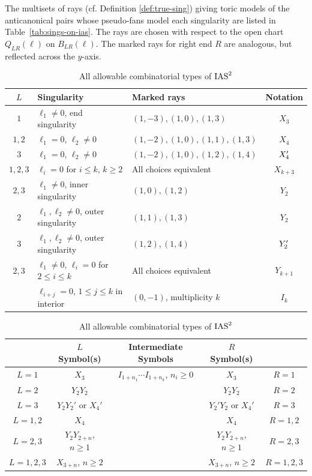 \documentclass[table,x11names]{amsart}
\begin{document}
\begin{definition}\label{enhanced-ias} 
The multisets of rays (cf. Definition \ref{def:true-sing})
giving toric models of the anticanonical pairs
whose pseudo-fans
model each singularity are listed
in Table~\ref{tab:sings-on-ias}. The rays
are chosen with respect to 
the open chart $Q_{LR}(\ell)$ on $B_{LR}(\ell)$.
The marked rays for right end $R$ are analogous, 
but reflected across the $y$-axis.
\begin{table}[h!]
\caption{Pseudofans modeling each singularity, for the left end type $L$}
\label{tab:sings-on-ias}
\begin{tabular}{c | l | l | c }
$L$ & Singularity & Marked rays & Notation \\ 
\hline
$1$ & $\ell_1\neq 0$, end singularity & $(1,-3),(1,0),(1,3)$ & $X_3$ \\
$1,2$ & $\ell_1=0$, $\ell_2\neq 0$ & $(1,-2),(1,0),(1,1),(1,3)$ & $X_4$ \\
$3$ & $\ell_1=0$, $\ell_2\neq 0$ & $(1,-2), (1,0),(1,2),(1,4)$ & $X'_4$ \\
$1,2, 3$ & $\ell_i=0$ for $i\leq k$, $k\geq 2$ & All choices equivalent & $X_{k+3}$ \\
$2,3$ & $\ell_1\neq 0$, inner singularity & $(1,0),(1,2)$ & $Y_2$ \\
$2$ & $\ell_1,\ell_2\neq 0$, outer singularity & $(1,1), (1,3)$ & $Y_2$ \\
$3$ & $\ell_1,\ell_2\neq 0$, outer singularity & $(1,2),(1,4)$ & $Y'_2$ \\
$2,3$ & $\ell_1\neq 0,\,\ell_i=0$ for $2\leq i \leq k$ & All choices equivalent & $Y_{k+1}$ \\
 & $\ell_{i+j}=0$, $1\leq j\leq k$ in interior & $(0,-1)$, multiplicity $k$ & $I_k$ \\
\end{tabular}
\bigskip
\caption{All allowable combinatorial types of $\operatorname{IAS}^2$}
\label{tab:all-types}
  \begin{tabular}[htp]{ c | c |  c | c | c }
& $L$ Symbol(s) &   Intermediate Symbols & $R$ Symbol(s) &   \\
    \hline
    $L=1$ & $X_3$ & $I_{1+n_1}\cdots I_{1+n_k}$, $n_i\geq 0$ &     $X_3$  & $R=1$  \\
    $L=2$ & $Y_2Y_2$ & &     $Y_2Y_2$ & $R=2$ \\
    $L=3$ & $Y_2Y_2'$ or $X_4'$ & &    $Y_2'Y_2$ or $X_4'$ & $R=3$ \\
    $L=1,2$ & $X_4$ & &     $X_4$ &  $R=1,2$ \\
    $L=2,3$ & $Y_2Y_{2+n}$, $n\geq 1$ & &    $Y_2Y_{2+n}$, $n\geq 1$ &  $R=2,3$ \\
    $L=1,2,3$ & $X_{3+n}$, $n\geq 2$ & &    $X_{3+n}$, $n\geq 2$ &   $R=1,2,3$
    \end{tabular}
\end{table} 
\end{definition}
\end{document}
